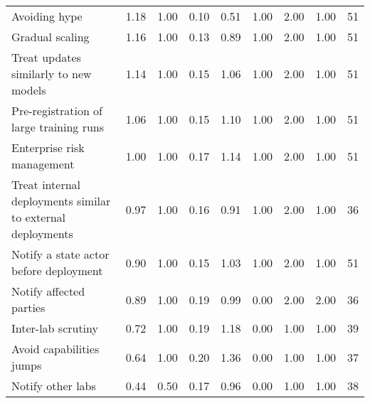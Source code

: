 \documentclass{article}
\begin{document}
\begin{sidewaystable}
\begin{adjustbox}{width=\textwidth, center}
\begin{tabular}{l r r r r r r r r}
Avoiding hype & 1.18 & 1.00 & 0.10 & 0.51 & 1.00 & 2.00 & 1.00 & 51 \\
Gradual scaling & 1.16 & 1.00 & 0.13 & 0.89 & 1.00 & 2.00 & 1.00 & 51 \\
Treat updates similarly to new models & 1.14 & 1.00 & 0.15 & 1.06 & 1.00 & 2.00 & 1.00 & 51 \\
Pre-registration of large training runs & 1.06 & 1.00 & 0.15 & 1.10 & 1.00 & 2.00 & 1.00 & 51 \\
Enterprise risk management & 1.00 & 1.00 & 0.17 & 1.14 & 1.00 & 2.00 & 1.00 & 51 \\
Treat internal deployments similar to external deployments & 0.97 & 1.00 & 0.16 & 0.91 & 1.00 & 2.00 & 1.00 & 36 \\
Notify a state actor before deployment & 0.90 & 1.00 & 0.15 & 1.03 & 1.00 & 2.00 & 1.00 & 51 \\
Notify affected parties & 0.89 & 1.00 & 0.19 & 0.99 & 0.00 & 2.00 & 2.00 & 36 \\
Inter-lab scrutiny & 0.72 & 1.00 & 0.19 & 1.18 & 0.00 & 1.00 & 1.00 & 39 \\
Avoid capabilities jumps & 0.64 & 1.00 & 0.20 & 1.36 & 0.00 & 1.00 & 1.00 & 37 \\
Notify other labs & 0.44 & 0.50 & 0.17 & 0.96 & 0.00 & 1.00 & 1.00 & 38 \\
\bottomrule
\end{tabular}
\end{adjustbox}
\end{sidewaystable}
\end{document}

